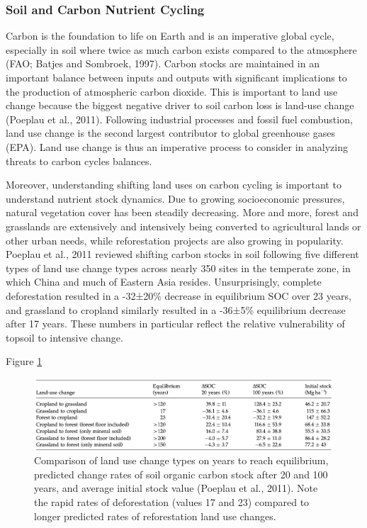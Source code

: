 \documentclass{book}\usepackage{knitr}
\begin{document}
\subsubsection{Soil and Carbon Nutrient Cycling}
Carbon is the foundation to life on Earth and is an imperative global cycle, especially in soil where twice as much carbon exists compared to the atmosphere (FAO; Batjes and Sombroek, 1997). Carbon stocks are maintained in an important balance between inputs and outputs with significant implications to the production of atmospheric carbon dioxide. This is important to land use change because the biggest negative driver to soil carbon loss is land-use change (Poeplau et al., 2011). Following industrial processes and fossil fuel combustion, land use change is the second largest contributor to global greenhouse gases (EPA). Land use change is thus an imperative process to consider in analyzing threats to carbon cycles balances.

Moreover, understanding shifting land uses on carbon cycling is important to understand nutrient stock dynamics. Due to growing socioeconomic pressures, natural vegetation cover has been steadily decreasing. More and more, forest and grasslands are extensively and intensively being converted to agricultural lands or other urban needs, while reforestation projects are also growing in popularity. Poeplau et al., 2011 reviewed shifting carbon stocks in soil following five different types of land use change types across nearly 350 sites in the temperate zone, in which China and much of Eastern Asia resides. Unsurprisingly, complete deforestation resulted in a -32±20\% decrease in equilibrium SOC over 23 years, and grassland to cropland similarly resulted in a -36±5\% equilibrium decrease after 17 years. These numbers in particular reflect the relative vulnerability of topsoil to intensive change.

Figure \ref{fig:LUC-SOC-Table}

\begin{figure}
\includegraphics[width=\linewidth]{images/land-use/LUC-SOC-Table.png}
\caption{Comparison of land use change types on years to reach equilibrium, predicted change rates of soil organic carbon stock after 20 and 100 years, and average initial stock value (Poeplau et al., 2011). Note the rapid rates of deforestation (values 17 and 23) compared to longer predicted rates of reforestation land use changes.}
\label{fig:LUC-SOC-Table}
\end{figure}
\end{document}
